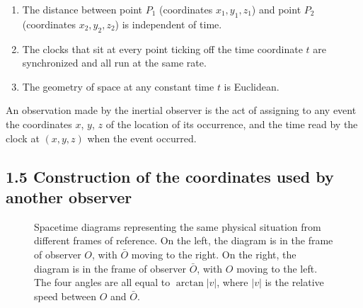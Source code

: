 \documentclass[12pt]{book}
\begin{document}
        \begin{enumerate}
            \item The distance between point \( P_1 \) (coordinates \( x_1, y_1, z_1 \)) and point \( P_2 \) (coordinates \( x_2, y_2, z_2 \)) is independent of time.
            \item The clocks that sit at every point ticking off the time coordinate \( t \) are synchronized and all run at the same rate.
            \item The geometry of space at any constant time \( t \) is Euclidean.
        \end{enumerate}
        An observation made by the inertial observer is the act of assigning to any event the coordinates \( x \), \( y \), \( z \) of the location of its occurrence, and the time read by the clock at \( (x, y, z) \) when the event occurred.
    \subsection{1.5 Construction of the coordinates used by another observer}
    \begin{figure}[h!]
        \centering
        \caption{Spacetime diagrams representing the same physical situation from different frames of reference. On the left, the diagram is in the frame of observer \(O\), with \(\bar{O}\) moving to the right. On the right, the diagram is in the frame of observer \(\bar{O}\), with \(O\) moving to the left. The four angles are all equal to \(\arctan{|v|}\), where \(|v|\) is the relative speed between \(O\) and \(\bar{O}\).}
        \end{figure}
\end{document}

